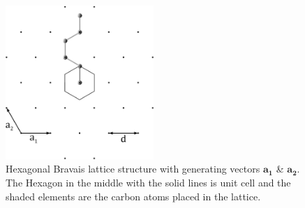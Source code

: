 \begin{figure}
 \centering
 \includegraphics[width=0.5\textwidth]{Figures/hexagon2.eps}
 \caption{Hexagonal Bravais lattice structure with generating vectors $\mathbf{a_{1}}$ \& $\mathbf{a_{2}}$. The Hexagon in the middle with the solid lines is unit cell and the shaded elements are the carbon atoms placed in the lattice.}
 \label{hexagon}
\end{figure}

